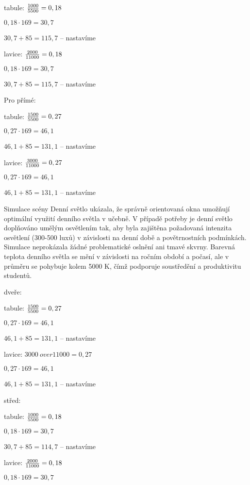 tabule: ${1000 \over 5500} = 0,18$

        ${0,18 \cdot 169} = 30,7$

        $30,7 + 85 = 115,7$ – nastavíme

lavice: ${2000 \over 11000} = 0,18$

        ${0,18 \cdot 169} = 30,7$

        $30,7 + 85 = 115,7$ – nastavíme

Pro přímé:

tabule: ${1500 \over 5500} = 0,27$

        ${0,27 \cdot 169} = 46,1$

        $46,1 + 85 = 131,1$ – nastavíme

lavice: ${3000 \over 11000} = 0,27$

        ${0,27 \cdot 169} = 46,1$

        $46,1 + 85 = 131,1$ – nastavíme


Simulace scény Denní světlo ukázala, že správně orientovaná okna umožňují optimální využití denního
světla v učebně. V případě potřeby je denní světlo doplňováno umělým osvětlením tak, aby byla zajištěna požadovaná
intenzita osvětlení (300-500 luxů) v závislosti na denní době a povětrnostních podmínkách. Simulace neprokázala žádné
problematické oslnění ani tmavé skvrny. Barevná teplota denního světla se mění v závislosti na ročním období a počasí,
ale v průměru se pohybuje kolem 5000 K, čímž podporuje soustředění a produktivitu studentů.

{\sbf dveře:}

tabule: ${1500 \over 5500} = 0,27$

        ${0,27 \cdot 169} = 46,1$

        $46,1 + 85 = 131,1$ – nastavíme

lavice: ${3000 \ over 11000} = 0,27$ 

        ${0,27 \cdot 169} = 46,1$

        $46,1 + 85 = 131,1$ – nastavíme

{\sbf střed:}


tabule: ${1000 \over 5500} = 0,18$ 

        ${0,18 \cdot 169} = 30,7$

        $30,7 + 85 = 114,7$ – nastavíme

lavice: ${2000 \over 11000} = 0,18$ 

        ${0,18 \cdot 169} = 30,7$


